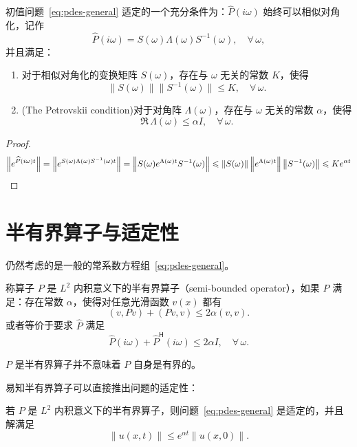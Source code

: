 \begin{theorem}\label{thm:well-posed-5}
    初值问题~\eqref{eq:pdes-general} 适定的一个充分条件为：$\widehat{P}(i \omega)$ 始终可以相似对角化，记作
    \[
        \widehat{P}(i \omega) = S(\omega ) \Lambda(\omega ) S^{-1}(\omega ),\quad \forall\,\omega,
    \]
    并且满足：
    \begin{enumerate}
        \item 对于相似对角化的变换矩阵 $S(\omega )$，存在与 $\omega $ 无关的常数 $K$，使得
              \[
                  \| S(\omega ) \| \| S^{-1}(\omega ) \| \le K,\quad \forall\,\omega.
              \]
        \item (The Petrovskii condition)对于对角阵 $\Lambda(\omega )$，存在与 $\omega $ 无关的常数 $\alpha$，使得
              \[
                  \Re \,\Lambda(\omega ) \le \alpha I,\quad \forall\,\omega.
              \]
    \end{enumerate}
\end{theorem}

\begin{proof}
    \[
        \left\| e^{\widehat{P}(i \omega )t} \right\| = \left\| e^{S(\omega ) \Lambda(\omega ) S^{-1}(\omega )t} \right\|
        =
        \left\|S(\omega ) e^{\Lambda(\omega ) t}S^{-1}(\omega ) \right\| \le \left\|S(\omega )\right\| \left\|e^{\Lambda(\omega ) t}\right\| \left\|S^{-1}(\omega ) \right\|
        \le K e^{\alpha t} \qedhere
    \]
\end{proof}


\section{半有界算子与适定性}

仍然考虑的是一般的常系数方程组~\eqref{eq:pdes-general}。

\begin{definition}
    称算子 $P$ 是 $L^2$ 内积意义下的半有界算子（semi-bounded operator），如果 $P$ 满足：存在常数 $\alpha$，使得对任意光滑函数 $v(x)$ 都有
    \[
        (v,Pv)+(Pv,v) \le 2\alpha (v,v).
    \]
    或者等价于要求 $\widehat{P}$ 满足
    \[
        \widehat{P}(i \omega) + \widehat{P}^{\mathsf{H}}(i \omega) \le 2 \alpha I,\quad \forall\,\omega.
    \]
\end{definition}

\begin{remark}
    $P$ 是半有界算子并不意味着 $P$ 自身是有界的。
\end{remark}


易知半有界算子可以直接推出问题的适定性：
\begin{theorem}\label{thm:well-posed-6}
    若 $P$ 是 $L^2$ 内积意义下的半有界算子，则问题~\eqref{eq:pdes-general} 是适定的，并且解满足
    \[
        \| u(x,t) \| \le e^{\alpha t} \| u(x,0) \|.
    \]
\end{theorem}

